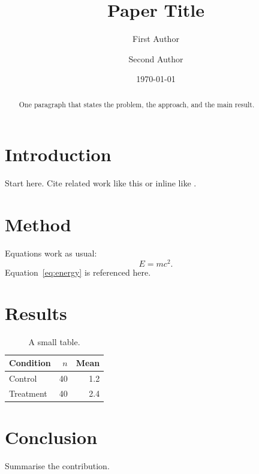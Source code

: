 \documentclass[11pt,a4paper]{article}
\title{Paper Title}
\author{First Author \and Second Author}
\date{\today}
\begin{document}
\maketitle

\begin{abstract}
One paragraph that states the problem, the approach, and the main result.
\end{abstract}

\section{Introduction}
Start here. Cite related work like this \citep{knuth1984} or inline like \citet{lamport1986}.

\section{Method}
Equations work as usual:
\begin{equation}
  E = mc^2 .
  \label{eq:energy}
\end{equation}
Equation~\ref{eq:energy} is referenced here.

\section{Results}
\begin{table}[htbp]
  \centering
  \caption{A small table.}
  \label{tab:example}
  \begin{tabular}{lrr}
    \toprule
    Condition & $n$ & Mean \\
    \midrule
    Control   & 40  & 1.2  \\
    Treatment & 40  & 2.4  \\
    \bottomrule
  \end{tabular}
\end{table}

\section{Conclusion}
Summarise the contribution.



\end{document}

